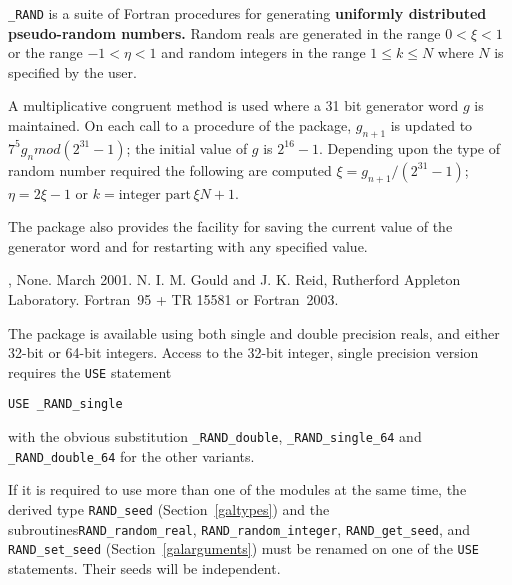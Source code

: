 \documentclass{galahad}
\newcommand{\packagename}{RAND}
\newcommand{\fullpackagename}{\libraryname\_\packagename}
\begin{document}
\galheader


\galsummary

{\tt \fullpackagename} is a suite of Fortran procedures for
generating {\bf uniformly distributed pseudo-random
 numbers. } Random reals are generated in the range $0 < \xi < 1$ or
 the range $-1 < \eta < 1$ and random integers in the range
 $1 \leq k \leq N$ where $N$ is specified by the user.

A multiplicative congruent method is used where a 31 bit generator
 word $g$ is maintained. On each call to a procedure of the package,
 $g_{n+1} $ is updated to $7^5 g_n mod (2^{31} - 1)$; the
 initial value of $g$ is $2^{16} - 1$.
 Depending upon the type of random number
 required the following are computed $\xi = g_{n+1} /(2^{31} - 1)$;
 $\eta = 2 \xi - 1$ or $k = \mbox{integer part}\, \xi N +1$.

The package also provides the facility for saving the current
 value of the generator word and for restarting with any specified
 value.



\galattributes
\galversions{\tt  \fullpackagename\_single, \fullpackagename\_double},
\galuses None.
\galdate March 2001.
\galorigin
N. I. M. Gould and J. K. Reid, Rutherford Appleton Laboratory.
\gallanguage Fortran~95 + TR 15581 or Fortran~2003.


\galhowto

The package is available using both single and double precision reals, 
and either 32-bit or 64-bit integers. Access to the 32-bit integer,
single precision version requires the {\tt USE} statement
\medskip

\hspace{8mm} {\tt USE \fullpackagename\_single}

\medskip
\noindent
with the obvious substitution {\tt \fullpackagename\_double},
{\tt \fullpackagename\_single\_64} and 
{\tt \fullpackagename\_double\_64} for the other variants.

\noindent
If it is required to use more than one of the modules at the same time, 
the derived type
{\tt \packagename\_seed}
(Section~\ref{galtypes})
and the subroutines{\tt \packagename\_random\_real},
{\tt \packagename\_random\_integer},
{\tt \packagename\_get\_seed},
and {\tt \packagename\_set\_seed}
(Section~\ref{galarguments})
must be renamed on one of the {\tt USE} statements.
Their seeds will be independent.
\end{document}
